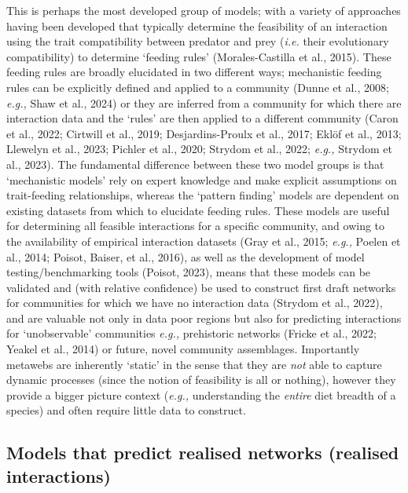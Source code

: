 \documentclass[
]{article}
\begin{document}
This is perhaps the most developed group of models; with a variety of
approaches having been developed that typically determine the
feasibility of an interaction using the trait compatibility between
predator and prey (\emph{i.e.} their evolutionary compatibility) to
determine `feeding rules' (Morales-Castilla et al., 2015). These feeding
rules are broadly elucidated in two different ways; mechanistic feeding
rules can be explicitly defined and applied to a community (Dunne et
al., 2008; \emph{e.g.,} Shaw et al., 2024) or they are inferred from a
community for which there are interaction data and the `rules' are then
applied to a different community (Caron et al., 2022; Cirtwill et al.,
2019; Desjardins-Proulx et al., 2017; Eklöf et al., 2013; Llewelyn et
al., 2023; Pichler et al., 2020; Strydom et al., 2022; \emph{e.g.,}
Strydom et al., 2023). The fundamental difference between these two
model groups is that `mechanistic models' rely on expert knowledge and
make explicit assumptions on trait-feeding relationships, whereas the
`pattern finding' models are dependent on existing datasets from which
to elucidate feeding rules. These models are useful for determining all
feasible interactions for a specific community, and owing to the
availability of empirical interaction datasets (Gray et al., 2015;
\emph{e.g.,} Poelen et al., 2014; Poisot, Baiser, et al., 2016), as well
as the development of model testing/benchmarking tools (Poisot, 2023),
means that these models can be validated and (with relative confidence)
be used to construct first draft networks for communities for which we
have no interaction data (Strydom et al., 2022), and are valuable not
only in data poor regions but also for predicting interactions for
`unobservable' communities \emph{e.g.,} prehistoric networks (Fricke et
al., 2022; Yeakel et al., 2014) or future, novel community assemblages.
Importantly metawebs are inherently `static' in the sense that they are
\emph{not} able to capture dynamic processes (since the notion of
feasibility is all or nothing), however they provide a bigger picture
context (\emph{e.g.,} understanding the \emph{entire} diet breadth of a
species) and often require little data to construct.

\subsection{Models that predict realised networks (realised
interactions)}\label{models-that-predict-realised-networks-realised-interactions}
\end{document}
